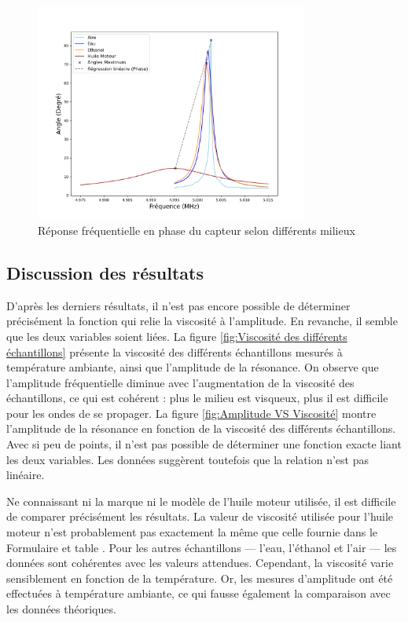 \begin{figure}[H]
    \centering
    \includegraphics[width=0.8\textwidth]{assets/figures/reponsePhase.png}
    \caption{Réponse fréquentielle en phase du capteur selon différents milieux}
    \label{fig:Réponse frequencielle déphasage}
\end{figure}

\subsection{Discussion des résultats}
D’après les derniers résultats, il n’est pas encore possible de déterminer précisément la fonction qui relie la viscosité à l’amplitude. En revanche, il semble que les deux variables soient liées.
La figure \ref{fig:Viscosité des différents échantillons} présente la viscosité des différents échantillons mesurés à température ambiante, ainsi que l’amplitude de la résonance.
On observe que l’amplitude fréquentielle diminue avec l’augmentation de la viscosité des échantillons, ce qui est cohérent : plus le milieu est visqueux, plus il est difficile pour les ondes de se propager.
La figure \ref{fig:Amplitude VS Viscosité} montre l’amplitude de la résonance en fonction de la viscosité des différents échantillons.
Avec si peu de points, il n’est pas possible de déterminer une fonction exacte liant les deux variables. Les données suggèrent toutefois que la relation n’est pas linéaire.

Ne connaissant ni la marque ni le modèle de l’huile moteur utilisée, il est difficile de comparer précisément les résultats. La valeur de viscosité utilisée pour l’huile moteur n’est probablement pas exactement la même que celle fournie dans le Formulaire et table \cite{crm_viscosity_table}.
Pour les autres échantillons — l’eau, l’éthanol et l’air — les données sont cohérentes avec les valeurs attendues.
Cependant, la viscosité varie sensiblement en fonction de la température. Or, les mesures d’amplitude ont été effectuées à température ambiante, ce qui fausse également la comparaison avec les données théoriques.

